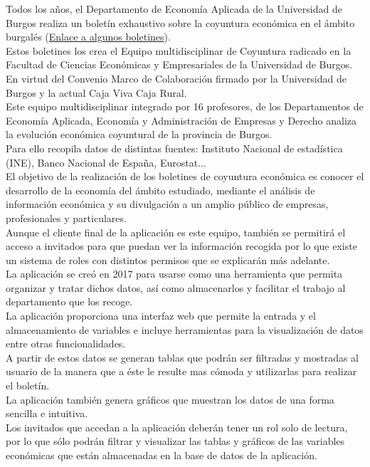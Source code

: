Todos los años, el Departamento de Economía Aplicada de la Universidad de Burgos realiza un boletín exhaustivo sobre la coyuntura económica en el ámbito burgalés (\href{https://www.ubu.es/departamento-de-economia-aplicada/investigacion-research/grupos-de-investigacion-research-groups/equipo-de-coyuntura-economica-de-burgos}{Enlace a algunos boletines}).\\
Estos boletines los crea el Equipo multidisciplinar de Coyuntura radicado en la Facultad de Ciencias Económicas y Empresariales de la Universidad de Burgos. En virtud del Convenio Marco de Colaboración firmado por la Universidad de Burgos y la actual Caja Viva Caja Rural.\\
Este equipo multidisciplinar integrado por 16 profesores, de los Departamentos de Economía Aplicada, Economía y Administración de Empresas y Derecho analiza la evolución económica coyuntural de la provincia de Burgos.\\
Para ello recopila datos de distintas fuentes: Instituto Nacional de estadística (INE), Banco Nacional de España, Eurostat...\\
El objetivo de la realización de los boletines de coyuntura económica es conocer el desarrollo de la economía del ámbito estudiado, mediante el análisis de información económica y su divulgación a un amplio público de empresas, profesionales y particulares.\\
Aunque el cliente final de la aplicación es este equipo, también se permitirá el acceso a invitados para que puedan ver la información recogida por lo que existe un sistema de roles con distintos permisos que se explicarán más adelante.\\
La aplicación se creó en 2017 para usarse como una herramienta que permita organizar y tratar dichos datos, así como almacenarlos y facilitar el trabajo al departamento que los recoge.\\
La aplicación proporciona una interfaz web que permite la entrada y el almacenamiento de variables e incluye herramientas para la visualización de datos entre otras funcionalidades.\\
A partir de estos datos se generan tablas que podrán ser filtradas y mostradas al usuario de la manera que a éste le resulte mas cómoda y utilizarlas para realizar el boletín.\\
La aplicación también genera gráficos que muestran los datos de una forma sencilla e intuitiva.\\
Los invitados que accedan a la aplicación deberán tener un rol solo de lectura, por lo que sólo podrán filtrar y visualizar las tablas y gráficos de las variables económicas que están almacenadas en la base de datos de la aplicación.\\
